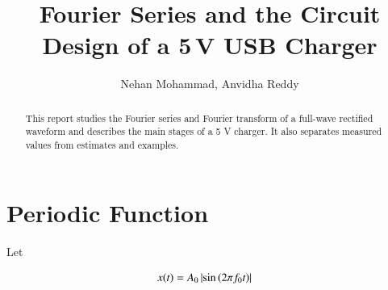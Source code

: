 \documentclass[journal,12pt,twocolumn]{IEEEtran}
\begin{document}
\makeatletter
{}
\makeatother

\let\StandardTheFigure\thefigure
\renewcommand{\thefigure}{\theproblem}

\def\putbox#1#2#3{
    \makebox[0in][l]{
        \makebox[#1][l]{}
        \raisebox{\baselineskip}[0in][0in]{
            \raisebox{#2}[0in][0in]{#3}
        }
    }
}
\def\rightbox#1{\makebox[0in][r]{#1}}
\def\centbox#1{\makebox[0in]{#1}}
\def\topbox#1{\raisebox{-\baselineskip}[0in][0in]{#1}}
\def\midbox#1{\raisebox{-0.5\baselineskip}[0in][0in]{#1}}

\vspace{3cm}

\title{Fourier Series and the Circuit Design of a 5\,V USB Charger}
\author{Nehan Mohammad, Anvidha Reddy}

\maketitle
\tableofcontents

\renewcommand{\thefigure}{\theenumi}
\renewcommand{\thetable}{\theenumi}

\bigskip

\begin{abstract}
This report studies the Fourier series and Fourier transform of a
full-wave rectified waveform and describes the main stages of a 5 V
charger. It also separates measured values from estimates and examples.
\end{abstract}

\section{Periodic Function}

Let

\begin{align}
    x(t) &= A_0\left\vert\sin\left(2\pi f_0t\right)\right\vert
    \label{eq:10-orig-diff-def}
\end{align}
\end{document}
